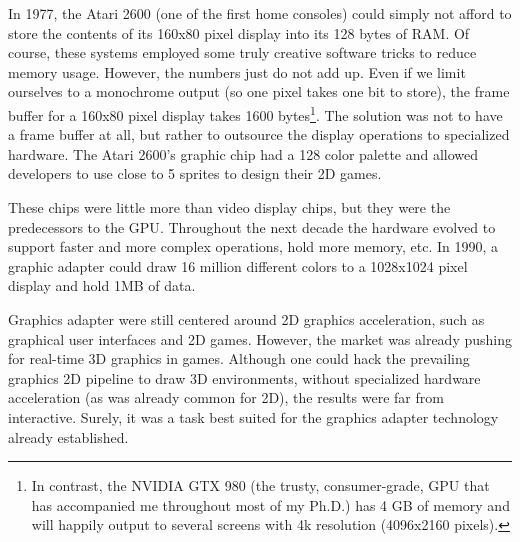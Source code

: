 \documentclass[ twoside,openright,titlepage,numbers=noenddot,%
headinclude,footinclude,cleardoublepage=empty,abstract=on,
BCOR=5mm,paper=b5,fontsize=11pt, dvipsnames
]{scrreprt}
\newcommand{\gpu}{\gls{GPU}\xspace}
\begin{document}
In 1977, the Atari 2600 (one of the first home consoles) could simply not afford to store the contents of its 160x80 pixel display into its 128 bytes of RAM. Of course, these systems employed some truly creative software tricks to reduce memory usage. However, the numbers just do not add up. Even if we limit ourselves to a monochrome output (so one pixel takes one bit to store), the frame buffer for a 160x80 pixel display takes 1600 bytes\footnote{In contrast, the NVIDIA GTX 980 (the trusty, consumer-grade, GPU that has accompanied me throughout most of my Ph.D.) has 4 GB of memory and will happily output to several screens with 4k resolution (4096x2160 pixels).}.
The solution was not to have a frame buffer at all, but rather to outsource the display operations to specialized hardware. The Atari 2600's graphic chip had a 128 color palette and allowed developers to use close to 5 sprites to design their 2D games.

These chips were little more than video display chips, but they were the predecessors to the \gpu.
Throughout the next decade the hardware evolved to support faster and more complex operations, hold more memory, etc. In 1990, a graphic adapter could draw 16 million different colors to a 1028x1024 pixel display and hold 1MB of data.

Graphics adapter were still centered around 2D graphics acceleration, such as graphical user interfaces and 2D games. However, the market was already pushing for real-time 3D graphics in games. Although one could hack the prevailing graphics 2D pipeline to draw 3D environments, without specialized hardware acceleration (as was already common for 2D), the results were far from interactive. Surely, it was a task best suited for the graphics adapter technology already established.
\end{document}

